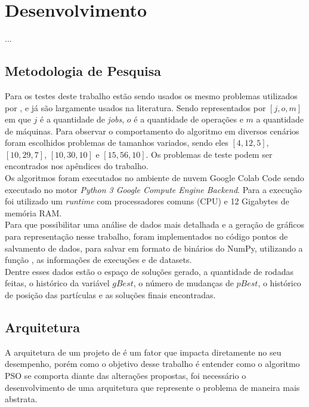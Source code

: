 \chapter{Desenvolvimento}
    ...


\section{Metodologia de Pesquisa}
Para os testes deste trabalho estão sendo usados os mesmo problemas utilizados por \cite{Kacem2002}, e já são largamente usados na literatura. Sendo representados por $[j, o, m]$ em que $j$ é a quantidade de \textit{jobs}, $o$ é a quantidade de operações e $m$ a quantidade de máquinas. Para observar o comportamento do algoritmo em diversos cenários foram escolhidos problemas de tamanhos variados, sendo eles $[4, 12, 5]$, $[10, 29, 7]$, $[10, 30, 10]$ e $[15, 56, 10]$. Os problemas de teste podem ser encontrados nos apêndices do trabalho.\\
%
\indent Os algoritmos foram executados no ambiente de nuvem Google Colab Code sendo executado no motor \textit{Python 3 Google Compute Engine Backend}. Para a execução foi utilizado um \textit{runtime} com processadores comuns (CPU) e 12 Gigabytes de memória RAM.\\
%
%
\indent Para que possibilitar uma análise de dados mais detalhada e a geração de gráficos para representação nesse trabalho, foram implementados no código pontos de salvamento de dados, para salvar em formato de binários do NumPy, utilizando a função , as informações de execuções e de datasets.\\
\indent Dentre esses dados estão o espaço de soluções gerado, a quantidade de rodadas feitas, o histórico da variável $gBest$, o número de mudanças de $pBest$, o histórico de posição das partículas e as soluções finais encontradas.


\section{Arquitetura}
A arquitetura de um projeto de é um fator que impacta diretamente no seu desempenho, porém como o objetivo desse trabalho é entender como o algoritmo PSO se comporta diante das alterações propostas, foi necessário o desenvolvimento de uma arquitetura que represente o problema de maneira mais abstrata.


